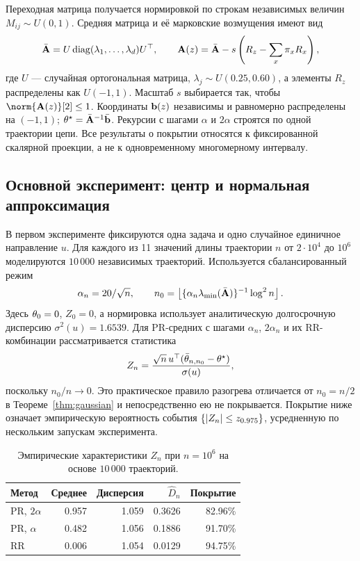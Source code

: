 \documentclass[blind]{psta}
\begin{document}
Переходная матрица получается нормировкой по строкам независимых величин
$M_{ij}\sim U(0,1)$. Средняя матрица и её марковские возмущения имеют вид
\[
 \bar{\mathbf{A}}=U\operatorname{diag}(\lambda_1,\ldots,\lambda_d)U^\top,
 \qquad
 \mathbf{A}(z)=\bar{\mathbf{A}}-s\left(R_z-\sum_x\pi_xR_x\right),
\]
где $U$ --- случайная ортогональная матрица,
$\lambda_j\sim U(0.25,0.60)$, а элементы $R_z$ распределены как $U(-1,1)$.
Масштаб $s$ выбирается так, чтобы $\norm{\zfuncA{z}}[2]\leq1$.
Координаты $\mathbf{b}(z)$ независимы и равномерно распределены на $(-1,1)$;
$\theta^\star=\bar{\mathbf{A}}^{-1}\bar{\mathbf{b}}$. Рекурсии с шагами $\alpha$ и $2\alpha$ строятся
по одной траектории цепи. Все результаты о покрытии относятся к фиксированной
скалярной проекции, а не к одновременному многомерному интервалу.

\subsection{Основной эксперимент: центр и нормальная аппроксимация}

В первом эксперименте фиксируются одна задача и одно случайное единичное
направление $u$. Для каждого из 11 значений длины траектории $n$ от $2\cdot10^4$ до $10^6$
моделируются $10\,000$ независимых траекторий. Используется сбалансированный
режим
\[
 \alpha_n=20/\sqrt n,\qquad
 n_0=\left\lfloor \{\alpha_n\lambda_{\min}(\bar{\mathbf{A}})\}^{-1}\log^2n \right\rfloor.
\]
Здесь $\theta_0=0$, $Z_0=0$, а нормировка использует аналитическую
долгосрочную дисперсию $\sigma^2(u)=1.6539$. Для PR-средних с шагами
$\alpha_n$, $2\alpha_n$ и их RR-комбинации рассматривается статистика
\[
 Z_n=\frac{\sqrt n\,u^\top
 (\bar{\theta}_{n,n_0}-\theta^\star)}{\sigma(u)},
\]
поскольку $n_0/n\to0$. Это практическое правило разогрева отличается от
$n_0=n/2$ в Теореме~\ref{thm:gaussian} и непосредственно ею не покрывается.
Покрытие ниже означает эмпирическую вероятность события
$\{\vert Z_n\vert\leq z_{0.975} \}$, усредненную по нескольким запускам эксперимента.

\begin{table}
\footnotesize
\renewcommand{\arraystretch}{1.15}
\caption{Эмпирические характеристики $Z_n$ при $n=10^6$ на основе
$10\,000$ траекторий.}
\label{tab:cdf}
\centering
\begin{tabular}{|l|r|r|r|r|}
\hline
Метод & Среднее & Дисперсия & $\widehat D_n$ & Покрытие \\
\hline
PR, $2\alpha$ & 0.957 & 1.059 & 0.3626 & 82.96\% \\
PR, $\alpha$  & 0.482 & 1.056 & 0.1886 & 91.70\% \\
RR                     & 0.006 & 1.054 & 0.0129 & 94.75\% \\
\hline
\end{tabular}
\end{table}
\end{document}
